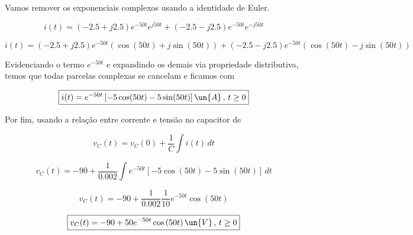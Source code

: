 Vamos remover os exponenciais complexos usando a identidade de Euler.

\[ i(t) = (-2.5 + j2.5)e^{-50t}e^{j50t} + (-2.5 - j2.5)e^{-50t}e^{-j50t} \]

\[ i(t) = (-2.5 + j2.5)e^{-50t}(\cos(50t) + j\sin(50t)) + (-2.5 - j2.5)e^{-50t}(\cos(50t) - j\sin(50t)) \]

Evidenciando o termo $e^{-50t}$ e expandindo os demais via propriedade distributiva, temos que todas 
parcelas complexas se cancelam e ficamos com

\[ \boxed{i(t) = e^{-50t}\left[-5\cos(50t) - 5\sin(50t)\right] \un{A} \, , \, t \geq 0 }  \]

Por fim, usando a relação entre corrente e tensão no capacitor de  

\[ v_C(t) = v_C(0) + \frac{1}{C} \int i(t) \, dt\]

\[ v_C(t) = -90 + \frac{1}{0.002} \int e^{-50t}\left[-5\cos(50t) - 5\sin(50t)\right] \, dt \]   

\[ v_C(t) = -90 + \frac{1}{0.002} \frac{1}{10}e^{-50t}\cos \left(50t\right) \]

\[ \boxed{v_C(t) = -90 + 50e^{-50t}\cos \left(50t\right) \un{V} \, , \, t \geq 0} \]

